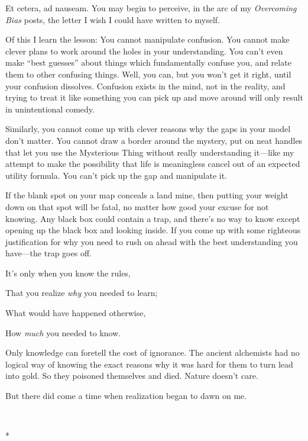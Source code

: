 {
 Et cetera, ad nauseam. You may begin to perceive, in the arc of my
\textit{Overcoming Bias} posts, the letter I wish I could have written
to myself.}

{
 Of this I learn the lesson: You cannot manipulate confusion. You
cannot make clever plans to work around the holes in your
understanding. You can't even make
``best guesses'' about things which
fundamentally confuse you, and relate them to other confusing things.
Well, you can, but you won't get it right, until your
confusion dissolves. Confusion exists in the mind, not in the reality,
and trying to treat it like something you can pick up and move around
will only result in unintentional comedy.}

{
 Similarly, you cannot come up with clever reasons why the gaps in
your model don't matter. You cannot draw a border
around the mystery, put on neat handles that let you use the Mysterious
Thing without really understanding it---like my attempt to make the
possibility that life is meaningless cancel out of an expected utility
formula. You can't pick up the gap and manipulate it.}

{
 If the blank spot on your map conceals a land mine, then putting
your weight down on that spot will be fatal, no matter how good your
excuse for not knowing. Any black box could contain a trap, and
there's no way to know except opening up the black box
and looking inside. If you come up with some righteous justification
for why you need to rush on ahead with the best understanding you
have---the trap goes off.}

{
 It's only when you know the rules,}

{
 That you realize \textit{why} you needed to learn;}

{
 What would have happened otherwise,}

{
 How \textit{much} you needed to know.}

{
 Only knowledge can foretell the cost of ignorance. The ancient
alchemists had no logical way of knowing the exact reasons why it was
hard for them to turn lead into gold. So they poisoned themselves and
died. Nature doesn't care.}

{
 But there did come a time when realization began to dawn on me.}

{\centering
 \ ~
\par}

{\centering
 *
\par}


\bigskip

